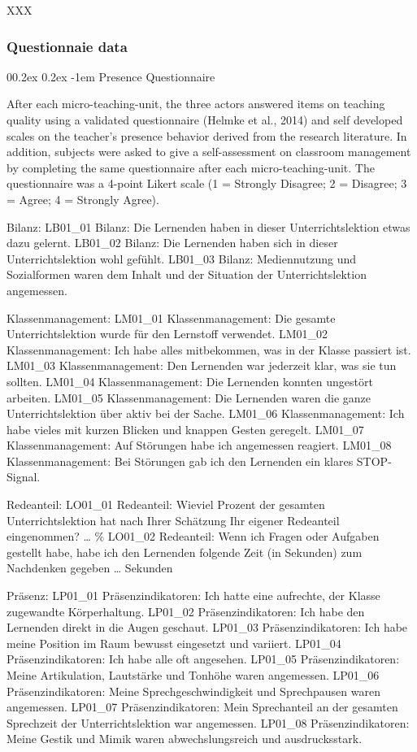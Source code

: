 \documentclass[
  man]{apa6}
\makeatletter
\let\oldparagraph\paragraph
\renewcommand{\paragraph}{
    \@ifstar
      \xxxParagraphStar
      \xxxParagraphNoStar
  }
\newcommand{\xxxParagraphStar}[1]{\oldparagraph*{#1}\mbox{}}
\newcommand{\xxxParagraphNoStar}[1]{\oldparagraph{#1}\mbox{}}
\renewcommand{\paragraph}{\@startsection{paragraph}{4}{\parindent}%
  {0\baselineskip \@plus 0.2ex \@minus 0.2ex}%
  {-1em}%
  {\normalfont\normalsize\bfseries\itshape\typesectitle}}
\makeatother
\begin{document}
XXX

\subsubsection{Questionnaie data}\label{questionnaie-data}

\paragraph{Presence Questionnaire}\label{presence-questionnaire}

After each micro-teaching-unit, the three actors answered items on teaching quality using a validated questionnaire (Helmke et al., 2014) and self developed scales on the teacher's presence behavior derived from the research literature. In addition, subjects were asked to give a self-assessment on classroom management by completing the same questionnaire after each micro-teaching-unit. The questionnaire was a 4-point Likert scale (1 = Strongly Disagree; 2 = Disagree; 3 = Agree; 4 = Strongly Agree).

Bilanz:
LB01\_01 Bilanz: Die Lernenden haben in dieser Unterrichtslektion etwas dazu gelernt.
LB01\_02 Bilanz: Die Lernenden haben sich in dieser Unterrichtslektion wohl gefühlt.
LB01\_03 Bilanz: Mediennutzung und Sozialformen waren dem Inhalt und der Situation der Unterrichtslektion angemessen.

Klassenmanagement:
LM01\_01 Klassenmanagement: Die gesamte Unterrichtslektion wurde für den Lernstoff verwendet.
LM01\_02 Klassenmanagement: Ich habe alles mitbekommen, was in der Klasse passiert ist.
LM01\_03 Klassenmanagement: Den Lernenden war jederzeit klar, was sie tun sollten.
LM01\_04 Klassenmanagement: Die Lernenden konnten ungestört arbeiten.
LM01\_05 Klassenmanagement: Die Lernenden waren die ganze Unterrichtslektion über aktiv bei der Sache.
LM01\_06 Klassenmanagement: Ich habe vieles mit kurzen Blicken und knappen Gesten geregelt.
LM01\_07 Klassenmanagement: Auf Störungen habe ich angemessen reagiert.
LM01\_08 Klassenmanagement: Bei Störungen gab ich den Lernenden ein klares STOP-Signal.

Redeanteil:
LO01\_01 Redeanteil: Wieviel Prozent der gesamten Unterrichtslektion hat nach Ihrer Schätzung Ihr eigener Redeanteil eingenommen? \ldots{} \%
LO01\_02 Redeanteil: Wenn ich Fragen oder Aufgaben gestellt habe, habe ich den Lernenden folgende Zeit (in Sekunden) zum Nachdenken gegeben \ldots{} Sekunden

Präsenz:
LP01\_01 Präsenzindikatoren: Ich hatte eine aufrechte, der Klasse zugewandte Körperhaltung.
LP01\_02 Präsenzindikatoren: Ich habe den Lernenden direkt in die Augen geschaut.
LP01\_03 Präsenzindikatoren: Ich habe meine Position im Raum bewusst eingesetzt und variiert.
LP01\_04 Präsenzindikatoren: Ich habe alle oft angesehen.
LP01\_05 Präsenzindikatoren: Meine Artikulation, Lautstärke und Tonhöhe waren angemessen.
LP01\_06 Präsenzindikatoren: Meine Sprechgeschwindigkeit und Sprechpausen waren angemessen.
LP01\_07 Präsenzindikatoren: Mein Sprechanteil an der gesamten Sprechzeit der Unterrichtslektion war angemessen.
LP01\_08 Präsenzindikatoren: Meine Gestik und Mimik waren abwechslungsreich und ausdrucksstark.
\end{document}
